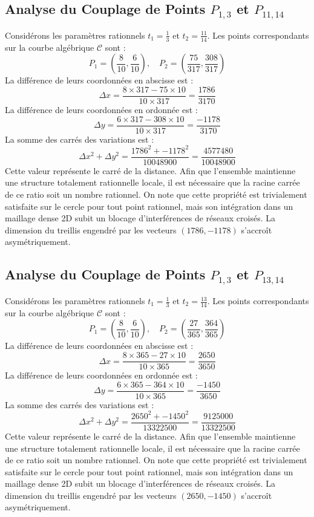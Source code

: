 \documentclass[12pt, a4paper]{article}
\begin{document}
\subsection{Analyse du Couplage de Points $P_{1,3}$ et $P_{11,14}$}
Considérons les paramètres rationnels $t_1 = \frac{1}{3}$ et $t_2 = \frac{11}{14}$.
Les points correspondants sur la courbe algébrique $\mathcal{C}$ sont :
$$ P_1 = \left( \frac{8}{10}, \frac{6}{10} \right), \quad P_2 = \left( \frac{75}{317}, \frac{308}{317} \right) $$
La différence de leurs coordonnées en abscisse est :
$$ \Delta x = \frac{8 \times 317 - 75 \times 10}{10 \times 317} = \frac{1786}{3170} $$
La différence de leurs coordonnées en ordonnée est :
$$ \Delta y = \frac{6 \times 317 - 308 \times 10}{10 \times 317} = \frac{-1178}{3170} $$
La somme des carrés des variations est :
$$ \Delta x^2 + \Delta y^2 = \frac{ 1786^2 + -1178^2 }{ 10048900 } = \frac{ 4577480 }{ 10048900 } $$
Cette valeur représente le carré de la distance. Afin que l'ensemble maintienne une structure totalement rationnelle locale, il est nécessaire que la racine carrée de ce ratio soit un nombre rationnel. On note que cette propriété est trivialement satisfaite sur le cercle pour tout point rationnel, mais son intégration dans un maillage dense 2D subit un blocage d'interférences de réseaux croisés. La dimension du treillis engendré par les vecteurs $( 1786, -1178 )$ s'accroît asymétriquement.


\subsection{Analyse du Couplage de Points $P_{1,3}$ et $P_{13,14}$}
Considérons les paramètres rationnels $t_1 = \frac{1}{3}$ et $t_2 = \frac{13}{14}$.
Les points correspondants sur la courbe algébrique $\mathcal{C}$ sont :
$$ P_1 = \left( \frac{8}{10}, \frac{6}{10} \right), \quad P_2 = \left( \frac{27}{365}, \frac{364}{365} \right) $$
La différence de leurs coordonnées en abscisse est :
$$ \Delta x = \frac{8 \times 365 - 27 \times 10}{10 \times 365} = \frac{2650}{3650} $$
La différence de leurs coordonnées en ordonnée est :
$$ \Delta y = \frac{6 \times 365 - 364 \times 10}{10 \times 365} = \frac{-1450}{3650} $$
La somme des carrés des variations est :
$$ \Delta x^2 + \Delta y^2 = \frac{ 2650^2 + -1450^2 }{ 13322500 } = \frac{ 9125000 }{ 13322500 } $$
Cette valeur représente le carré de la distance. Afin que l'ensemble maintienne une structure totalement rationnelle locale, il est nécessaire que la racine carrée de ce ratio soit un nombre rationnel. On note que cette propriété est trivialement satisfaite sur le cercle pour tout point rationnel, mais son intégration dans un maillage dense 2D subit un blocage d'interférences de réseaux croisés. La dimension du treillis engendré par les vecteurs $( 2650, -1450 )$ s'accroît asymétriquement.
\end{document}
